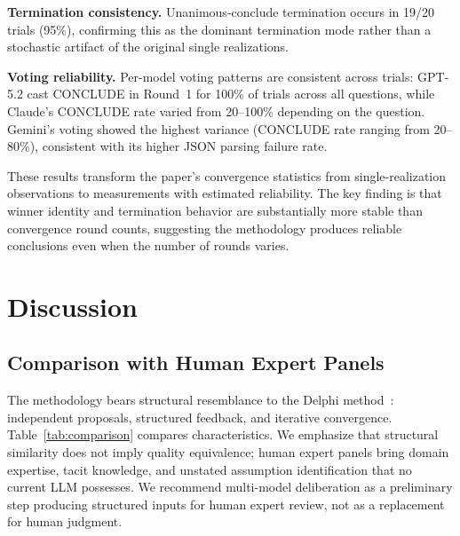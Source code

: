 \documentclass[11pt,a4paper]{article}
\begin{document}
\textbf{Termination consistency.} Unanimous-conclude termination occurs in 19/20 trials (95\%), confirming this as the dominant termination mode rather than a stochastic artifact of the original single realizations.

\textbf{Voting reliability.} Per-model voting patterns are consistent across trials: GPT-5.2 cast CONCLUDE in Round~1 for 100\% of trials across all questions, while Claude's CONCLUDE rate varied from 20--100\% depending on the question. Gemini's voting showed the highest variance (CONCLUDE rate ranging from 20--80\%), consistent with its higher JSON parsing failure rate.

These results transform the paper's convergence statistics from single-realization observations to measurements with estimated reliability. The key finding is that winner identity and termination behavior are substantially more stable than convergence round counts, suggesting the methodology produces reliable conclusions even when the number of rounds varies.

\section{Discussion}
\label{sec:discussion}

\subsection{Comparison with Human Expert Panels}

The methodology bears structural resemblance to the Delphi method~\cite{linstone1975delphi}: independent proposals, structured feedback, and iterative convergence. Table~\ref{tab:comparison} compares characteristics. We emphasize that structural similarity does not imply quality equivalence; human expert panels bring domain expertise, tacit knowledge, and unstated assumption identification that no current LLM possesses. We recommend multi-model deliberation as a preliminary step producing structured inputs for human expert review, not as a replacement for human judgment.
\end{document}
